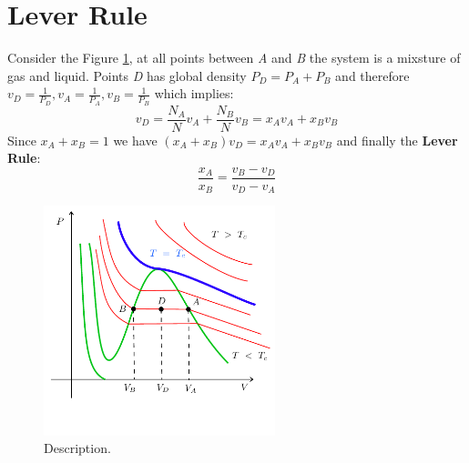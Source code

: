 \documentclass[../main/main.tex]{subfiles}
\begin{document}


\section{Lever Rule}
Consider the Figure \ref{fig:3_0}, at all points between \emph{A} and \emph{B} the system is a mixsture of gas and liquid. Points \emph{D} has global density \( P_D = P_A + P_B \)  and therefore \( v_D = \frac{1}{P_D}, v_A = \frac{1}{P_A}, v_B = \frac{1}{P_B} \) which implies:
\begin{equation}
  v_D = \frac{N_A}{N} v_A + \frac{N_B}{N} v_B = x_A v_A + x_B v_B
  \label{eq:}
\end{equation}
Since \( x_A + x_B = 1 \) we have \( (x_A + x_B)v_D = x_A v_A + x_B v_B \) and finally the \textbf{Lever Rule}:
\begin{equation}
  \frac{x_A}{x_B} = \frac{v_B - v_D}{v_D - v_A}
  \label{eq:}
\end{equation}

\begin{figure}[h!]
\centering
\includegraphics[width=0.6\textwidth]{../lessons/3_image/1.pdf}
\caption{\label{fig:3_0} Description.}
\end{figure}
\end{document}
